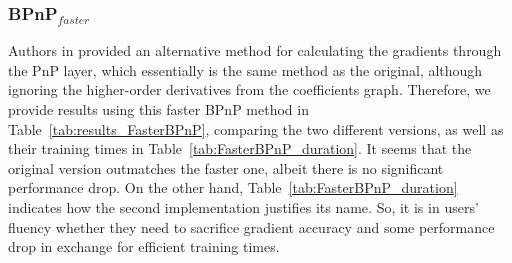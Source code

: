 \subsubsection{BPnP$_{faster}$}
Authors in \cite{chen2020end} provided an alternative method for calculating the gradients through the PnP layer, which essentially is the same method as the original, although ignoring the higher-order derivatives from the coefficients graph.
Therefore, we provide results using this faster BPnP method in Table~\ref{tab:results_FasterBPnP}, comparing the two different versions, as well as their training times in Table~\ref{tab:FasterBPnP_duration}. 
It seems that the original version outmatches the faster one, albeit there is no significant performance drop. 
On the other hand, Table~\ref{tab:FasterBPnP_duration} indicates how the second implementation justifies its name. So, it is in users' fluency whether they need to sacrifice gradient accuracy and some performance drop in exchange for efficient training times.



